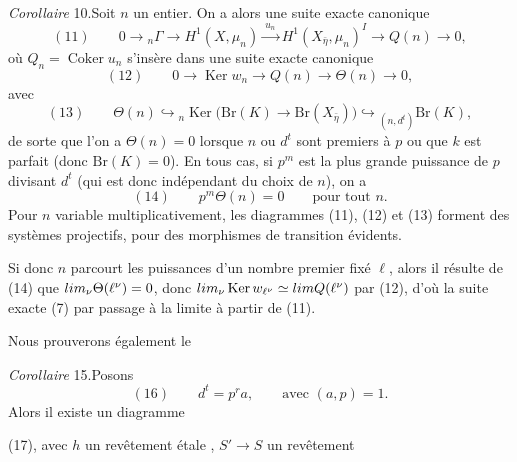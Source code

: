 \documentclass[11pt,a4paper]{article}
\begin{document}
\emph{Corollaire} 10.\quad Soit $n$ un entier. On a alors une suite exacte
canonique
\[
(11) \qquad 0 \to {}_n\Gamma \to H^1(X, \mu_n) \xrightarrow{\ u_n\ }
H^1(X_{\bar\eta}, \mu_n)^I \to Q(n) \to 0 ,
\]
où $Q_n = \operatorname{Coker} u_n$ s'insère dans une suite exacte canonique
\[
(12) \qquad 0 \to \operatorname{Ker} w_n \to Q(n) \to \Theta(n) \longrightarrow 0 ,
\]
avec
\[
(13) \qquad \Theta(n) \hookrightarrow {}_n\operatorname{Ker}\bigl(\mathrm{Br}(K)
\to \mathrm{Br}(X_{\bar\eta})\bigr) \hookrightarrow {}_{(n,d^t)}\mathrm{Br}(K) ,
\]
de sorte que l'on a $\Theta(n) = 0$ lorsque $n$ ou $d^t$ sont premiers à $p$
ou que $k$ est parfait (donc $\mathrm{Br}(K) = 0$). En tous cas, si $p^m$ est
la plus grande puissance de $p$ divisant $d^t$ (qui est donc indépendant du
choix de $n$), on a
\[
(14) \qquad p^m \Theta(n) = 0 \qquad \text{pour tout } n .
\]
Pour $n$ variable multiplicativement, les diagrammes (11), (12) et (13)
forment des systèmes projectifs, pour des morphismes de transition évidents.

Si donc $n$ parcourt les puissances d'un nombre premier fixé $\ell$, alors il
résulte de (14) que $\varprojlim_\nu \Theta(\ell^\nu) = 0$, donc
$\varprojlim_\nu \operatorname{Ker} w_{\ell^\nu} \simeq \varprojlim Q(\ell^\nu)$
par (12), d'où la suite exacte (7) par passage à la limite à partir de (11).

Nous prouverons également le

\emph{Corollaire} 15.\quad Posons
\[
(16) \qquad d^t = p^r a , \qquad \text{avec } (a,p) = 1 .
\]
Alors il existe un diagramme


(17), avec $h$ un revêtement étale 
\ill{}, $S' \to S$ un revêtement
\end{document}
